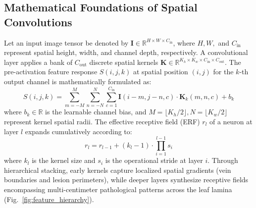 \documentclass[11pt,a4paper]{article}
\begin{document}
\subsection{Mathematical Foundations of Spatial Convolutions}
Let an input image tensor be denoted by $\mathbf{I} \in \mathbb{R}^{H \times W \times C_{\text{in}}}$, where $H, W,$ and $C_{\text{in}}$ represent spatial height, width, and channel depth, respectively. A convolutional layer applies a bank of $C_{\text{out}}$ discrete spatial kernels $\mathbf{K} \in \mathbb{R}^{K_h \times K_w \times C_{\text{in}} \times C_{\text{out}}}$. The pre-activation feature response $S(i, j, k)$ at spatial position $(i, j)$ for the $k$-th output channel is mathematically formulated as:
\begin{equation}
S(i, j, k) = \sum_{m=-M}^{M} \sum_{n=-N}^{N} \sum_{c=1}^{C_{\text{in}}} \mathbf{I}(i - m, j - n, c) \cdot \mathbf{K}_k(m, n, c) + b_k
\label{eq:spatial_conv}
\end{equation}
where $b_k \in \mathbb{R}$ is the learnable channel bias, and $M = \lfloor K_h / 2 \rfloor, N = \lfloor K_w / 2 \rfloor$ represent kernel spatial radii. The effective receptive field (ERF) $r_l$ of a neuron at layer $l$ expands cumulatively according to:
\begin{equation}
r_l = r_{l-1} + (k_l - 1) \cdot \prod_{i=1}^{l-1} s_i
\label{eq:receptive_field}
\end{equation}
where $k_l$ is the kernel size and $s_i$ is the operational stride at layer $i$. Through hierarchical stacking, early kernels capture localized spatial gradients (vein boundaries and lesion perimeters), while deeper layers synthesize receptive fields encompassing multi-centimeter pathological patterns across the leaf lamina (Fig.~\ref{fig:feature_hierarchy}).
\end{document}
